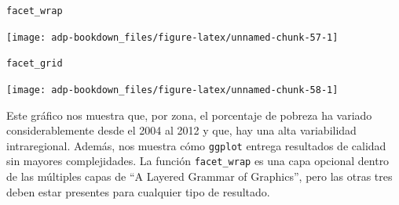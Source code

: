 \documentclass[]{book}
\newenvironment{Shaded}{\begin{snugshade}}{\end{snugshade}}
\newcommand{\DataTypeTok}[1]{\textcolor[rgb]{0.13,0.29,0.53}{#1}}
\newcommand{\DecValTok}[1]{\textcolor[rgb]{0.00,0.00,0.81}{#1}}
\newcommand{\KeywordTok}[1]{\textcolor[rgb]{0.13,0.29,0.53}{\textbf{#1}}}
\newcommand{\NormalTok}[1]{#1}
\newcommand{\OperatorTok}[1]{\textcolor[rgb]{0.81,0.36,0.00}{\textbf{#1}}}
\newcommand{\StringTok}[1]{\textcolor[rgb]{0.31,0.60,0.02}{#1}}
\begin{document}
\texttt{facet\_wrap}

\begin{Shaded}
\end{Shaded}

\begin{center}\texttt{[image: adp-bookdown\_files/figure-latex/unnamed-chunk-57-1]} \end{center}

\texttt{facet\_grid}

\begin{Shaded}
\end{Shaded}

\begin{center}\texttt{[image: adp-bookdown\_files/figure-latex/unnamed-chunk-58-1]} \end{center}

Este gráfico nos muestra que, por zona, el porcentaje de pobreza ha
variado considerablemente desde el 2004 al 2012 y que, hay una alta
variabilidad intraregional. Además, nos muestra cómo \texttt{ggplot}
entrega resultados de calidad sin mayores complejidades. La función
\texttt{facet\_wrap} es una capa opcional dentro de las múltiples capas
de ``A Layered Grammar of Graphics'', pero las otras tres deben estar
presentes para cualquier tipo de resultado.
\end{document}
